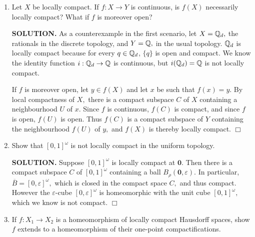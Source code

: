 \documentclass{article}
\begin{document}
\begin{enumerate}
\begin{enumerate}
        {\bf SOLUTION.} Suppose that each $X_\alpha$ is locally compact, and $X_\alpha$ is compact for all but finitely many indices $\alpha.$ Given $\mathbf{x} \in \prod X_\alpha$, there exists, for every $\alpha,$ a compact subspace $C_\alpha$ of $X_\alpha$ containing some neighbourhood $U_\alpha$ of $x_\alpha.$ By the Tychonoff Theorem, $\prod C_\alpha$ is compact, and it clearly contains the neighbourhood $\prod U_\alpha$ of $\mathbf{x}.$ $\Box$
    \end{enumerate}
    \item Let $X$ be locally compact. If $f: X \rightarrow Y$ is continuous, is $f(X)$ necessarily locally compact? What if $f$ is moreover open?

    {\bf SOLUTION.} As a counterexample in the first scenario, let $X=\mathbb{Q}_d,$ the rationals in the discrete topology, and $Y = \mathbb{Q},$ in the usual topology. $\mathbb{Q}_d$ is locally compact because for every $q \in \mathbb{Q}_d$, $\{q\}$ is open and compact. We know the identity function $i: \mathbb{Q}_d \rightarrow \mathbb{Q}$ is continuous, but $i(\mathbb{Q}_d) = \mathbb{Q}$ is not locally compact.

    If $f$ is moreover open, let $y \in f(X)$ and let $x$ be such that $f(x) = y.$ By local compactness of $X,$ there is a compact subspace $C$ of $X$ containing a neighbourhood $U$ of $x.$ Since $f$ is continuous, $f(C)$ is compact, and since $f$ is open, $f(U)$ is open. Thus $f(C)$ is a compact subspace of $Y$ containing the neighbourhood $f(U)$ of $y,$ and $f(X)$ is thereby locally compact. $\Box$

    \item Show that $[0,1]^\omega$ is not locally compact in the uniform topology.

    {\bf SOLUTION.} Suppose $[0, 1]^\omega$ is locally compact at $\mathbf{0}.$ Then there is a compact subspace $C$ of $[0, 1]^\omega$ containing a ball $B_\rho(\mathbf{0}, \varepsilon).$ In particular, $\overline{B} = [0, \varepsilon]^\omega,$ which is closed in the compact space $C,$ and thus compact. However the $\varepsilon$-cube $[0, \varepsilon]^\omega$ is homeomorphic with the unit cube $[0, 1]^\omega,$ which we know is not compact. $\Box$

    \item If $f: X_1 \rightarrow X_2$ is a homeomorphism of locally compact Hausdorff spaces, show $f$ extends to a homeomorphism of their one-point compactifications.


\end{enumerate}
\end{document}
